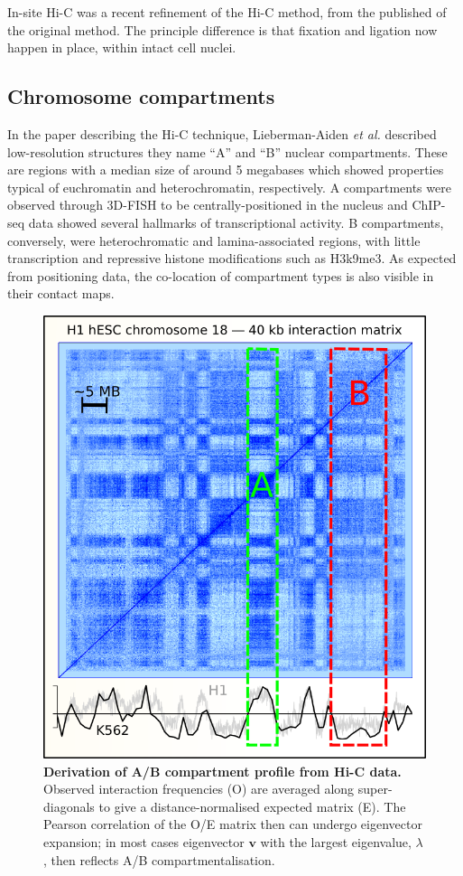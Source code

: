 \documentclass[a4paper,10pt,oneside]{book}
\begin{document}
In-site Hi-C was a recent refinement of the Hi-C method, from the published of the original method.\cite{Rao2014} The principle difference is that fixation and ligation now happen in place, within intact cell nuclei.

\subsection{Chromosome compartments}\label{sec:compartments}

In the paper describing the Hi-C technique,\cite{Lieberman2009}  Lieberman-Aiden \emph{et
  al.} described low-resolution structures they name  ``A'' and ``B'' nuclear compartments. These are regions with a median size of around 5 megabases which showed properties typical
of euchromatin and heterochromatin, respectively. A compartments were observed through 3D-FISH to be centrally-positioned in the nucleus and  ChIP-seq data showed several hallmarks of transcriptional activity. B compartments, conversely, were heterochromatic and lamina-associated regions, with little transcription and repressive histone modifications such as H3k9me3.\cite{Lieberman2009, DeWit2012} As expected from positioning data, the co-location of compartment types is also visible in their contact maps. 

\begin{figure}
\begin{center}
\includegraphics[width=.75\textwidth]{figs/eigcalc.png}
\captionsetup{width=\textwidth}
\caption[Derivation of A/B compartment profile from Hi-C data.]{ {\bf Derivation of A/B compartment profile from Hi-C data.} 
Observed interaction frequencies (O) are averaged along super-diagonals to give a distance-normalised expected matrix (E). The Pearson correlation of the O/E matrix then can undergo eigenvector expansion; in most cases eigenvector $\mathbf{v}$ with the largest eigenvalue, $\lambda$, then reflects A/B compartmentalisation.\cite{Lieberman2009}
}\label{fig:eigcalc}
\end{center}
\end{figure} 
\end{document}
